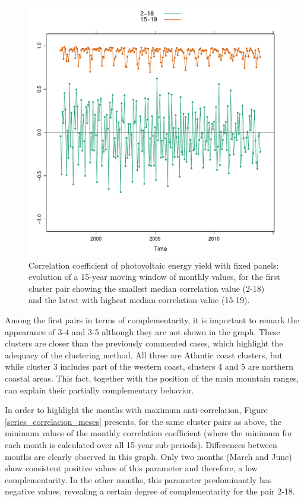 \begin{figure}[h!]
\includegraphics[scale=0.6]{figs/capitulo5/figure8.pdf}
\caption[Correlation coefficients of the yearly energy yield for the two pairs of clusters with the highest and smallest correlation values over the Iberian Peninsula]{Correlation coefficient of photovoltaic energy yield with fixed panels: evolution of a 15-year moving window of monthly values, for the first cluster pair showing the smallest median correlation value (2-18) and the latest with highest median correlation value (15-19).}
\label{series_correlacion}
\end{figure}

Among the first pairs in terms of complementarity, it is important to remark the appearance of 3-4 and 3-5 although they are not shown in the graph. These clusters are closer than the previously commented cases, which highlight the adequacy of the clustering method. All three are Atlantic coast clusters, but while cluster 3 includes part of the western coast, clusters 4 and 5 are northern coastal areas. This fact, together with the position of the main mountain ranges, can explain their partially complementary behavior.

In order to highlight the months with maximum anti-correlation, Figure \ref{series_correlacion_meses} presents, for the same cluster pairs as above, the minimum values of the monthly correlation coefficient (where the minimum for each month is calculated over all 15-year sub-periods). Differences between months are clearly observed in this graph. Only two months (March and June) show consistent positive values of this parameter and therefore, a low complementarity. In the other months, this parameter predominantly has negative values, revealing a certain degree of complementarity for the pair 2-18.

